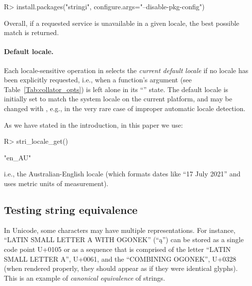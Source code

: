 \documentclass[nojss]{jss}
\begin{document}
\begin{Schunk}
\begin{Sinput}
R> install.packages("stringi", configure.args="--disable-pkg-config")
\end{Sinput}
\end{Schunk}

Overall, if a requested service is unavailable
in a given locale, the best possible match is returned.


\paragraph{Default locale.}
Each locale-sensitive operation in  selects the \textit{current
default locale} if no locale has been explicitly requested,
i.e., when a function's  argument (see Table~\ref{Tab:collator_opts})
is left alone in its ``'' state.
The default locale is initially set to match the system locale on the current
platform, and may be changed with , e.g.,
in the very rare case of improper automatic locale detection.

As we have stated in the introduction, in this paper we use:

\begin{Schunk}
\begin{Sinput}
R> stri_locale_get()
\end{Sinput}
\begin{Soutput}
[1] "en_AU"
\end{Soutput}
\end{Schunk}

\noindent
i.e., the Australian-English locale
(which formats dates like ``17 July 2021'' and
uses metric units of measurement).

%
%
%
%
%







\subsection{Testing string equivalence}\label{Sec:Equivalence}



In Unicode, some characters may have multiple representations.
For instance, ``LATIN SMALL LETTER A WITH OGONEK'' (``ą'') can be stored
as a single code point U+0105 or as a sequence
that is comprised of the letter ``LATIN SMALL LETTER A'', U+0061, and
the ``{COMBINING OGONEK}'', U+0328 (when rendered properly, they
should appear as if they were identical glyphs).
This is an example of \textit{canonical equivalence} of strings.
\end{document}
